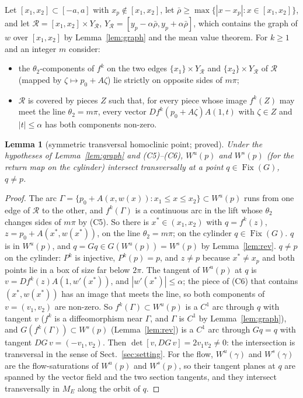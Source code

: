 \documentclass[11pt]{article}
\newtheorem{lemma}{Lemma}
\theoremstyle{definition}
\newcommand{\Fix}{\operatorname{Fix}}
\begin{document}
Let $[x_1, x_2] \subset [-a, a]$ with $x_p \notin [x_1, x_2]$, let $\bar\rho \ge \max\{|x - x_p| : x \in [x_1, x_2]\}$, and let $\mathcal R = [x_1, x_2] \times Y_{\mathcal R}$, $Y_{\mathcal R} = [y_p - \alpha\bar\rho, y_p + \alpha\bar\rho]$, which contains the graph of $w$ over $[x_1, x_2]$ by Lemma~\ref{lem:graph} and the mean value theorem. For $k \ge 1$ and an integer $m$ consider:
\begin{itemize}
\item[(C5)] the $\theta_2$-components of $f^k$ on the two edges $\{x_1\} \times Y_{\mathcal R}$ and $\{x_2\} \times Y_{\mathcal R}$ of $\mathcal R$ (mapped by $\zeta \mapsto p_0 + A\zeta$) lie strictly on opposite sides of $m\pi$;
\item[(C6)] $\mathcal R$ is covered by pieces $Z$ such that, for every piece whose image $f^k(Z)$ may meet the line $\theta_2 = m\pi$, every vector $Df^k(p_0 + A\zeta)A(1, t)$ with $\zeta \in Z$ and $|t| \le \alpha$ has both components non-zero.
\end{itemize}

\begin{lemma}[symmetric transversal homoclinic point; proved]\label{lem:cross}
Under the hypotheses of Lemma~\ref{lem:graph} and (C5)--(C6), $W^u(p)$ and $W^s(p)$ (for the return map on the cylinder) intersect transversally at a point $q \in \Fix(G)$, $q \ne p$.
\end{lemma}

\begin{proof}
The arc $\Gamma = \{p_0 + A(x, w(x)) : x_1 \le x \le x_2\} \subset W^u(p)$ runs from one edge of $\mathcal R$ to the other, and $f^k(\Gamma)$ is a continuous arc in the lift whose $\theta_2$ changes sides of $m\pi$ by (C5). So there is $x^* \in (x_1, x_2)$ with $q = f^k(z)$, $z = p_0 + A(x^*, w(x^*))$, on the line $\theta_2 = m\pi$; on the cylinder $q \in \Fix(G)$. $q$ is in $W^u(p)$, and $q = Gq \in G(W^u(p)) = W^s(p)$ by Lemma~\ref{lem:rev}. $q \ne p$ on the cylinder: $P^k$ is injective, $P^k(p) = p$, and $z \ne p$ because $x^* \ne x_p$ and both points lie in a box of size far below $2\pi$. The tangent of $W^u(p)$ at $q$ is $v = Df^k(z)A(1, w'(x^*))$, and $|w'(x^*)| \le \alpha$; the piece of (C6) that contains $(x^*, w(x^*))$ has an image that meets the line, so both components of $v = (v_1, v_2)$ are non-zero. So $f^k(\Gamma) \subset W^u(p)$ is a $C^1$ arc through $q$ with tangent $v$ ($f^k$ is a diffeomorphism near $\Gamma$, and $\Gamma$ is $C^1$ by Lemma~\ref{lem:graph}), and $G(f^k(\Gamma)) \subset W^s(p)$ (Lemma~\ref{lem:rev}) is a $C^1$ arc through $Gq = q$ with tangent $DG\,v = (-v_1, v_2)$. Then $\det[v, DG\,v] = 2v_1v_2 \ne 0$: the intersection is transversal in the sense of Sect.~\ref{sec:setting}. For the flow, $W^{u}(\gamma)$ and $W^s(\gamma)$ are the flow-saturations of $W^u(p)$ and $W^s(p)$, so their tangent planes at $q$ are spanned by the vector field and the two section tangents, and they intersect transversally in $M_E$ along the orbit of $q$.
\end{proof}
\end{document}
